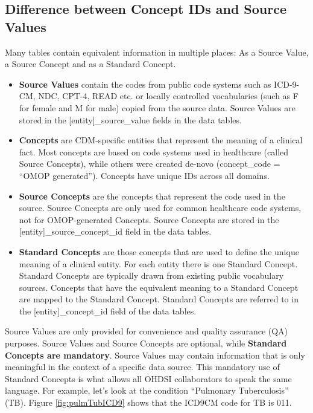 \documentclass[11pt]{book}
\providecommand{\tightlist}{%
  \setlength{\itemsep}{0pt}\setlength{\parskip}{0pt}}
\theoremstyle{definition}
\theoremstyle{definition}
\theoremstyle{definition}
\theoremstyle{remark}
\begin{document}
\hypertarget{difference-between-concept-ids-and-source-values}{%
\subsection{Difference between Concept IDs and Source Values}\label{difference-between-concept-ids-and-source-values}}

Many tables contain equivalent information in multiple places: As a Source Value, a Source Concept and as a Standard Concept.

\begin{itemize}
\tightlist
\item
  \textbf{Source Values} contain the codes from public code systems such as ICD-9-CM, NDC, CPT-4, READ etc. or locally controlled vocabularies (such as F for female and M for male) copied from the source data. Source Values are stored in the {[}entity{]}\_source\_value fields in the data tables.
\item
  \textbf{Concepts} are CDM-specific entities that represent the meaning of a clinical fact. Most concepts are based on code systems used in healthcare (called Source Concepts), while others were created de-novo (concept\_code = ``OMOP generated''). Concepts have unique IDs across all domains.
\item
  \textbf{Source Concepts} are the concepts that represent the code used in the source. Source Concepts are only used for common healthcare code systems, not for OMOP-generated Concepts. Source Concepts are stored in the {[}entity{]}\_source\_concept\_id field in the data tables.
\item
  \textbf{Standard Concepts} are those concepts that are used to define the unique meaning of a clinical entity. For each entity there is one Standard Concept. Standard Concepts are typically drawn from existing public vocabulary sources. Concepts that have the equivalent meaning to a Standard Concept are mapped to the Standard Concept. Standard Concepts are referred to in the {[}entity{]}\_concept\_id field of the data tables.
\end{itemize}

Source Values are only provided for convenience and quality assurance (QA) purposes. Source Values and Source Concepts are optional, while \textbf{Standard Concepts are mandatory}. Source Values may contain information that is only meaningful in the context of a specific data source. This mandatory use of Standard Concepts is what allows all OHDSI collaborators to speak the same language. For example, let's look at the condition ``Pulmonary Tuberculosis'' (TB). Figure \ref{fig:pulmTubICD9} shows that the ICD9CM code for TB is 011.
\end{document}
